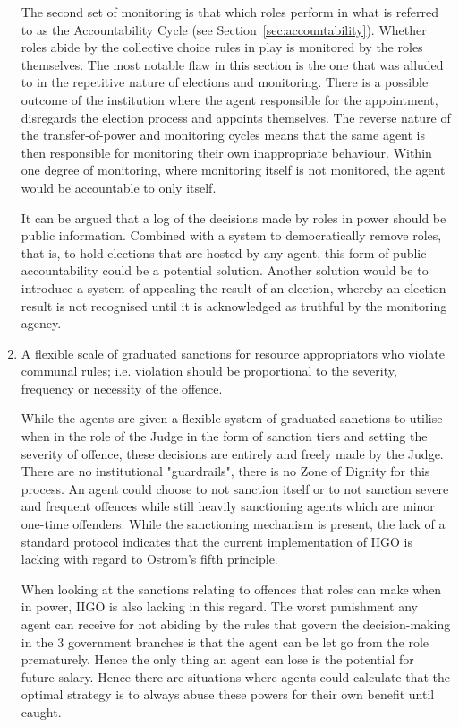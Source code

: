 \begin{enumerate}
    The second set of monitoring is that which roles perform in what is referred to as the Accountability Cycle (see Section~\ref{sec:accountability}). Whether roles abide by the collective choice rules in play is monitored by the roles themselves. The most notable flaw in this section is the one that was alluded to in the repetitive nature of elections and monitoring. There is a possible outcome of the institution where the agent responsible for the appointment, disregards the election process and appoints themselves. The reverse nature of the transfer-of-power and monitoring cycles means that the same agent is then responsible for monitoring their own inappropriate behaviour. Within one degree of monitoring, where monitoring itself is not monitored, the agent would be accountable to only itself. 

    It can be argued that a log of the decisions made by roles in power should be public information. Combined with a system to democratically remove roles, that is, to hold elections that are hosted by any agent, this form of public accountability could be a potential solution. Another solution would be to introduce a system of appealing the result of an election, whereby an election result is not recognised until it is acknowledged as truthful by the monitoring agency. 


    \item A flexible scale of graduated sanctions for resource appropriators who violate communal rules; i.e. violation should be proportional to the severity, frequency or necessity of the offence.
    
    While the agents are given a flexible system of graduated sanctions to utilise when in the role of the Judge in the form of sanction tiers and setting the severity of offence, these decisions are entirely and freely made by the Judge. There are no institutional "guardrails", there is no Zone of Dignity for this process. An agent could choose to not sanction itself or to not sanction severe and frequent offences while still heavily sanctioning agents which are minor one-time offenders. While the sanctioning mechanism is present, the lack of a standard protocol indicates that the current implementation of IIGO is lacking with regard to Ostrom's fifth principle.

    When looking at the sanctions relating to offences that roles can make when in power, IIGO is also lacking in this regard. The worst punishment any agent can receive for not abiding by the rules that govern the decision-making in the 3 government branches is that the agent can be let go from the role prematurely. Hence the only thing an agent can lose is the potential for future salary. Hence there are situations where agents could calculate that the optimal strategy is to always abuse these powers for their own benefit until caught.


\end{enumerate}

